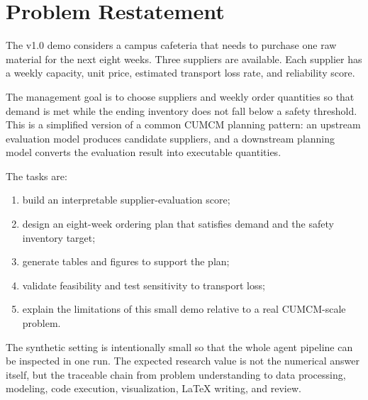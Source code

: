 \section{Problem Restatement}

The v1.0 demo considers a campus cafeteria that needs to purchase one raw material for the next eight weeks. Three suppliers are available. Each supplier has a weekly capacity, unit price, estimated transport loss rate, and reliability score.

The management goal is to choose suppliers and weekly order quantities so that demand is met while the ending inventory does not fall below a safety threshold. This is a simplified version of a common CUMCM planning pattern: an upstream evaluation model produces candidate suppliers, and a downstream planning model converts the evaluation result into executable quantities.

The tasks are:

\begin{enumerate}
  \item build an interpretable supplier-evaluation score;
  \item design an eight-week ordering plan that satisfies demand and the safety inventory target;
  \item generate tables and figures to support the plan;
  \item validate feasibility and test sensitivity to transport loss;
  \item explain the limitations of this small demo relative to a real CUMCM-scale problem.
\end{enumerate}

The synthetic setting is intentionally small so that the whole agent pipeline can be inspected in one run. The expected research value is not the numerical answer itself, but the traceable chain from problem understanding to data processing, modeling, code execution, visualization, LaTeX writing, and review.
